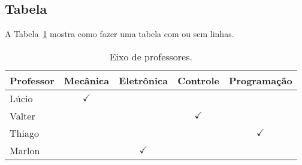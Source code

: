 \subsection{Tabela}

A Tabela~\ref{tbl:exemplo} mostra como fazer uma tabela com ou sem linhas.

\begin{table}
  \begin{tabular}{l|cccc}
    \toprule
    Professor & Mecânica       & Eletrônica     & Controle       & Programação    \\ \midrule
    Lúcio     & \(\checkmark\) &                &                &                \\
    Valter    &                &                & \(\checkmark\) &                \\
    Thiago    &                &                &                & \(\checkmark\) \\
    Marlon    &                & \(\checkmark\) &                &                \\
    \bottomrule
  \end{tabular}
  \caption{Eixo de professores.}%
  \label{tbl:exemplo}
\end{table}
